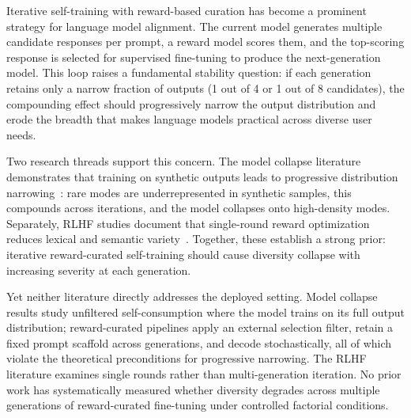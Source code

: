
Iterative self-training with reward-based curation has become a prominent strategy for language model alignment. The current model generates multiple candidate responses per prompt, a reward model scores them, and the top-scoring response is selected for supervised fine-tuning to produce the next-generation model. This loop raises a fundamental stability question: if each generation retains only a narrow fraction of outputs (1 out of 4 or 1 out of 8 candidates), the compounding effect should progressively narrow the output distribution and erode the breadth that makes language models practical across diverse user needs.

Two research threads support this concern. The model collapse literature demonstrates that training on synthetic outputs leads to progressive distribution narrowing~\cite{placeholder_shumailov, placeholder_alemohammad}: rare modes are underrepresented in synthetic samples, this compounds across iterations, and the model collapses onto high-density modes. Separately, RLHF studies document that single-round reward optimization reduces lexical and semantic variety~\cite{placeholder_kirk}. Together, these establish a strong prior: iterative reward-curated self-training should cause diversity collapse with increasing severity at each generation.

Yet neither literature directly addresses the deployed setting. Model collapse results study unfiltered self-consumption where the model trains on its full output distribution; reward-curated pipelines apply an external selection filter, retain a fixed prompt scaffold across generations, and decode stochastically, all of which violate the theoretical preconditions for progressive narrowing. The RLHF literature examines single rounds rather than multi-generation iteration. No prior work has systematically measured whether diversity degrades across multiple generations of reward-curated fine-tuning under controlled factorial conditions.

